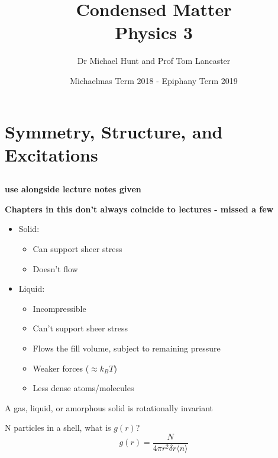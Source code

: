 \documentclass[a4paper, 11pt, normalem]{report}
\title{Condensed Matter \\ Physics 3 \vspace{-20pt}}
\author{Dr Michael Hunt and Prof Tom Lancaster}
\date{\vspace{-15pt}Michaelmas Term 2018 - Epiphany Term 2019}
\begin{document}
\maketitle
\tableofcontents

\part{Symmetry, Structure, and Excitations}
\chapter{}
\textbf{use alongside lecture notes given}

\textbf{Chapters in this don't always coincide to lectures - missed a few}

\begin{itemize}
    \item Solid:
        \begin{itemize}
            \item Can support sheer stress
            \item Doesn't flow
        \end{itemize}

    \item Liquid:
        \begin{itemize}
            \item Incompressible
            \item Can't support sheer stress
            \item Flows the fill volume, subject to remaining pressure
            \item Weaker forces ($\approx k_B T$)
            \item Less dense atoms/molecules
        \end{itemize}
\end{itemize}

A gas, liquid, or amorphous solid is rotationally invariant

N particles in a shell, what is $g(r)$?
\begin{equation}
    g(r) = \frac{N}{4\pi r^2\delta r\langle n\rangle}
\end{equation}
\end{document}
